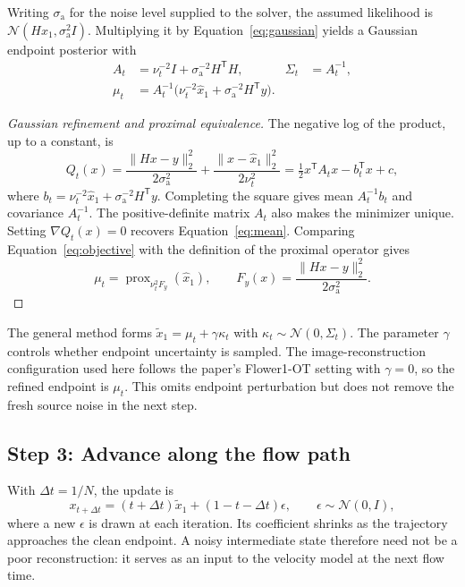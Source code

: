 \documentclass[10pt,letterpaper]{article}
\newcommand{\N}{\mathcal{N}}
\newcommand{\sa}{\sigma_{\mathrm a}}
\newcommand{\xhat}{\widehat{x}_1}
\begin{document}
Writing $\sa$ for the noise level supplied to the solver, the assumed likelihood is $\N(Hx_1,\sa^2I)$. Multiplying it by Equation~\eqref{eq:gaussian} yields a Gaussian endpoint posterior with
\begin{align}
 A_t&=\nu_t^{-2}I+\sa^{-2}H^\mathsf{T}H,&
 \Sigma_t&=A_t^{-1},\label{eq:precision}\\
 \mu_t&=A_t^{-1}\bigl(\nu_t^{-2}\xhat+\sa^{-2}H^\mathsf{T}y\bigr).
 \label{eq:mean}
\end{align}
\begin{proof}[Gaussian refinement and proximal equivalence]
The negative log of the product, up to a constant, is
\begin{equation}
 Q_t(x)=\frac{\|Hx-y\|_2^2}{2\sa^2}
       +\frac{\|x-\xhat\|_2^2}{2\nu_t^2}
       =\tfrac12x^\mathsf{T}A_tx-b_t^\mathsf{T}x+c,
 \label{eq:objective}
\end{equation}
where $b_t=\nu_t^{-2}\xhat+\sa^{-2}H^\mathsf{T}y$. Completing the square gives mean $A_t^{-1}b_t$ and covariance $A_t^{-1}$. The positive-definite matrix $A_t$ also makes the minimizer unique. Setting $\nabla Q_t(x)=0$ recovers Equation~\eqref{eq:mean}. Comparing Equation~\eqref{eq:objective} with the definition of the proximal operator gives
\begin{equation}
 \mu_t=\operatorname{prox}_{\nu_t^2 F_y}(\xhat),
 \qquad F_y(x)=\frac{\|Hx-y\|_2^2}{2\sa^2}.
\end{equation}
\end{proof}
The general method forms $\widetilde x_1=\mu_t+\gamma\kappa_t$ with $\kappa_t\sim\N(0,\Sigma_t)$. The parameter $\gamma$ controls whether endpoint uncertainty is sampled. The image-reconstruction configuration used here follows the paper's Flower1-OT setting with $\gamma=0$, so the refined endpoint is $\mu_t$. This omits endpoint perturbation but does not remove the fresh source noise in the next step.

\subsection{Step 3: Advance along the flow path}
With $\Delta t=1/N$, the update is
\begin{equation}
 x_{t+\Delta t}=(t+\Delta t)\widetilde x_1+(1-t-\Delta t)\epsilon,
 \qquad \epsilon\sim\N(0,I),
 \label{eq:progress}
\end{equation}
where a new $\epsilon$ is drawn at each iteration. Its coefficient shrinks as the trajectory approaches the clean endpoint. A noisy intermediate state therefore need not be a poor reconstruction: it serves as an input to the velocity model at the next flow time.
\end{document}
